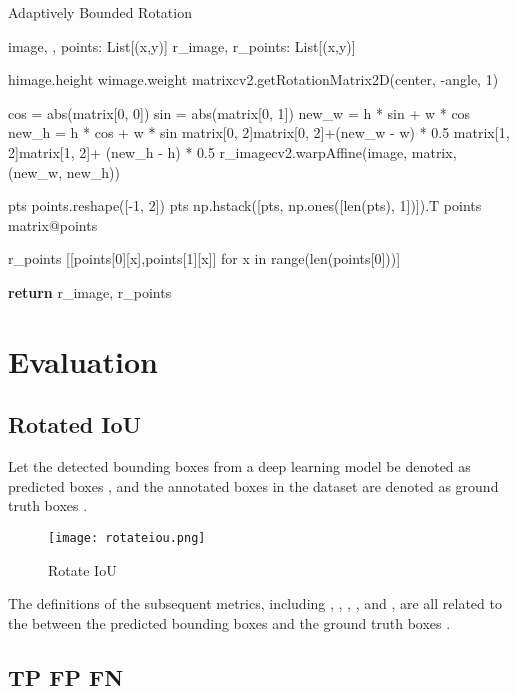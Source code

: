 \documentclass{article}
\begin{document}
\begin{algorithm}[h]
\caption{Adaptively Bounded Rotation}
\begin{algorithmic}[1]
\Require image, , points: List[(x,y)]
\Ensure r\_image, r\_points: List[(x,y)]

\State himage.height
\State wimage.weight
\State matrixcv2.getRotationMatrix2D(center, -angle, 1)

\State cos = abs(matrix[0, 0]) 
\State sin = abs(matrix[0, 1])
\State new_w = h * sin + w * cos
\State new_h = h * cos + w * sin
\State matrix[0, 2]matrix[0, 2]+(new_w - w) * 0.5
\State matrix[1, 2]matrix[1, 2]+ (new_h - h) * 0.5
\State r_imagecv2.warpAffine(image, matrix, (new\_w, new\_h))


\State pts  points.reshape([-1, 2])
\State pts  np.hstack([pts, np.ones([len(pts), 1])]).T
\State points  matrix@points

\State r_points  [[points[0][x],points[1][x]] for x in range(len(points[0]))]


\State \textbf{return} r\_image, r\_points
\end{algorithmic}
\label{algorithm:a2}
\end{algorithm}

\section{Evaluation}

\subsection{Rotated IoU}

Let the detected bounding boxes from a deep learning model be denoted as predicted boxes , and the annotated boxes in the dataset are denoted as ground truth boxes .

\begin{figure}
    \centering
    \texttt{[image: rotateiou.png]}
    \caption{Rotate IoU}
    \label{fig:rotatediou}
\end{figure}





The definitions of the subsequent metrics, including , , , , and , are all related to the  between the predicted bounding boxes  and the ground truth boxes .

\subsection{TP FP FN}
\end{document}
